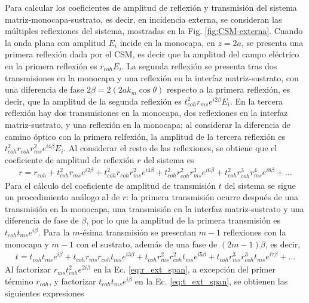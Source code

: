 Para calcular los coeficientes de amplitud de reflexión y transmisión del sistema matriz-monocapa-sustrato, es decir, en incidencia externa, se consideran las múltiples reflexiones del sistema, mostradas en la Fig. \ref{fig:CSM-externa}. Cuando la onda plana con amplitud $E_i$ incide en la monocapa, en $z=2a$, se presenta una primera reflexión dada por el CSM, es decir que la amplitud del campo eléctrico en la primera reflexión es $r_{coh}E_i$. La segunda reflexión se presenta tras dos transmisiones en la monocapa y una reflexión en la interfaz matriz-sustrato, con una diferencia de fase $2\beta=2(2ak_m\cos\theta)$ respecto a la primera reflexión, es decir, que la amplitud de la segunda reflexión es $t_{coh}^2r_{ms}e^{i2\beta}E_i$. En la tercera reflexión hay dos transmisiones en la monocapa, dos reflexiones en la interfaz matriz-sustrato, y una reflexión en la monocapa; al considerar la diferencia de camino óptico con la primera relfexión, la amplitud de la tercera reflexión es $t_{coh}^2r_{coh}r_{ms}^2e^{i4\beta}E_i$. Al considerar el resto de las reflexiones, se obtiene que el coeficiente de amplitud de reflexión $r$ del sistema es 
%
	\begin{align}
	r = r_{coh} +
		 t_{coh}^2r_{ms}e^{i2\beta}+
		 t_{coh}^2r_{coh}r_{ms}^2e^{i4\beta}+
		 t_{coh}^2r_{coh}^2r_{ms}^3e^{i6\beta}+
		 t_{coh}^2r_{coh}^3r_{ms}^4e^{i8\beta}+\ldots
	\label{eq:r_ext_span}
	\end{align}
%
Para el cálculo del coeficiente de amplitud de transmisión $t $ del sistema se sigue un procedimiento análogo al de $r$: la primera transmisión ocurre después de una transmisión en la monocapa, una transmisión en la interfaz matriz-sustrato y una diferencia de fase de $\beta$, por lo que la amplitud de la primera transmisión es $t_{coh}t_{ms}e^{i\beta}$. Para la $m$-ésima transmisión se presentan $m-1$ reflexiones con la monocapa y $m-1$ con el sustrato, además de una fase de $(2m-1)\beta$, es decir,
%
	\begin{align}
	t = t_{coh}t_{ms}e^{i\beta} +
		t_{coh}r_{ms}r_{coh}t_{ms}e^{i3\beta}+
		t_{coh}r_{ms}^2r_{coh}^2t_{ms}e^{i5\beta}+	
		t_{coh}r_{ms}^3r_{coh}^3t_{ms}e^{i7\beta}+ \ldots					
	\label{eq:t_ext_span}
	\end{align}\noindent
%	
Al factorizar $r_{ms}t_{coh}^2e^{2i\beta}$ en la Ec. \eqref{eq:r_ext_span}, a excepción del primer término $r_{coh}$, y factorizar $t_{coh}t_{ms}e^{i\beta}$ en la Ec. \eqref{eq:t_ext_span}, se obtienen las siguientes expresiones
